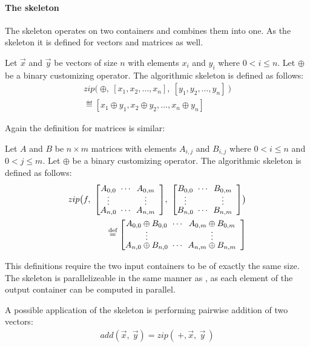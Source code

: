 \paragraph{The \zip skeleton}
The \zip skeleton operates on two containers and combines them into one.
As the \map skeleton it is defined for vectors and matrices as well.
\begin{definition}
  \label{definition:zip}
  Let $\vec{x}$ and $\vec{y}$ be vectors of size $n$ with elements $x_i$ and $y_i$ where $0 < i \leq n$.
  Let $\oplus$ be a binary customizing operator.
  The algorithmic skeleton \zip is defined as follows:
  \begin{equation*}
    \begin{split}
    zip \big(\ \oplus,\ [x_1, x_2, \dots, x_n],\ [y_1, y_2, \dots, y_n]\ \big)\\
      \eqdef [x_1 \oplus y_1, x_2 \oplus y_2, \dots, x_n \oplus y_n]
    \end{split}
  \end{equation*}
\end{definition}
\noindent
Again the definition for matrices is similar:
\begin{definition}
  \label{definition:zip:matrix}
  Let $A$ and $B$ be $n\times m$ matrices with elements $A_{i,j}$ and $B_{i,j}$ where $0 < i \leq n$ and $0 < j \leq m$.
  Let $\oplus$ be a binary customizing operator.
  The algorithmic skeleton \zip is defined as follows:
  \begin{equation*}
    \begin{split}
    zip\big( f,\ {\DottedMatrix{A_{0,0}}{A_{0,m}}{A_{n,0}}{A_{n,m}}},\
                 {\DottedMatrix{B_{0,0}}{B_{0,m}}{B_{n,0}}{B_{n,m}}}\big) \\
      \eqdef \DottedMatrix{A_{0,0} \oplus B_{0,0}}{A_{0,m} \oplus B_{0,m}}{A_{n,0} \oplus B_{n,0}}{A_{n,m} \oplus B_{n,m}}
    \end{split}
  \end{equation*}
\end{definition}
\noindent
This definitions require the two input containers to be of exactly the same size.
The \zip skeleton is parallelizeable in the same manner as \map, as each element of the output container can be computed in parallel.

A possible application of the \zip skeleton is performing pairwise addition of two vectors:
\begin{align*}
  add(\vec{x},\ \vec{y}) = zip(\ +, \vec{x},\ \vec{y}\ )
\end{align*}


